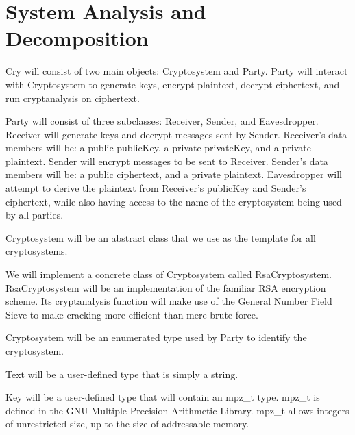 \section{System Analysis and Decomposition}


Cry will consist of two main objects: Cryptosystem and
Party. Party will interact with Cryptosystem to generate
keys, encrypt plaintext, decrypt ciphertext, and run
cryptanalysis on ciphertext.
\medskip

Party will consist of three subclasses: Receiver, Sender,
and Eavesdropper. Receiver will generate keys and decrypt
messages sent by Sender. Receiver's data members will be:
a public publicKey, a private privateKey, and a private
plaintext. Sender will encrypt messages to be sent to
Receiver. Sender's data members will be: a public
ciphertext, and a private plaintext. Eavesdropper will
attempt to derive the plaintext from Receiver's publicKey and
Sender's ciphertext, while also having access to the name
of the cryptosystem being used by all parties.
\medskip

Cryptosystem will be an abstract class that we use as the
template for all cryptosystems.
\medskip

We will implement a concrete class of Cryptosystem called
RsaCryptosystem. RsaCryptosystem will be an implementation
of the familiar RSA encryption scheme. Its cryptanalysis
function will make use of the General Number Field Sieve to
make cracking more efficient than mere brute force.
\medskip

Cryptosystem will be an enumerated type used by Party to
identify the cryptosystem.
\medskip

Text will be a user-defined type that is simply a string.
\medskip

Key will be a user-defined type that will contain an
mpz\_t type. mpz\_t is defined in the GNU Multiple Precision
Arithmetic Library. mpz\_t allows integers of unrestricted
size, up to the size of addressable memory.
